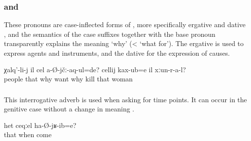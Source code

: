 
\subsubsection{ and  }
\label{sssec:cel and celij why}

These pronouns are case-inflected forms of  , more specifically ergative  and dative , and the semantics of the case suffixes together with the base pronoun transparently explains the meaning `why' (< `what for'). The ergative is used to express agents and instruments, and the dative for the expression of causes.
%
\begin{exe}
	\ex	\label{ex:Why did the people not love him? Why did the women kill him}
	\gll	χalq'-li-j	il	cel	a-Ø-jčː-aq-ul=de?	cellij	kax-ub=e	il xːun-r-a-l?\\
		people	that	why	want	why	kill	that	woman\\
	\glt	{}
\end{exe}



\subsubsection{ }
\label{sssec:ceqel when}

This interrogative adverb is used when asking for time points. It can occur in the genitive case without a change in meaning .
%
\begin{exe}
	\ex	\label{ex:When did he come}
	\gll	het	ceqːel	ha-Ø-jʁ-ib=e?\\
		that	when	come\\
	\glt	{}
\end{exe}
%

